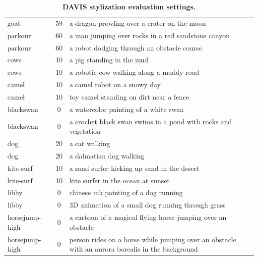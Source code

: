 \begin{table}[tp]
\begin{tabular}{lcp{10cm}}
goat & 59 & a dragon prowling over a crater on the moon \\
parkour & 60 & a man jumping over rocks in a red sandstone canyon \\
parkour & 60 & a robot dodging through an obstacle course \\
cows & 10 & a pig standing in the mud \\
cows & 10 & a robotic cow walking along a muddy road \\
camel & 10 & a camel robot on a snowy day  \\
camel & 10 & toy camel standing on dirt near a fence \\
blackswan & 0 & a watercolor painting of a white swan \\
blackswan & 0 & a crochet black swan swims in a pond with rocks and vegetation \\
dog & 20 & a cat walking \\
dog & 20 & a dalmatian dog walking \\
kite-surf & 10 & a sand surfer kicking up sand in the desert \\
kite-surf & 10 & kite surfer in the ocean at sunset \\
libby & 0 & chinese ink painting of a dog running \\
libby & 0 & 3D animation of a small dog running  through grass \\
horsejump-high & 0 & a cartoon of a magical flying horse jumping over an obstacle \\
horsejump-high & 0 & person rides on a horse while jumping over an obstacle with an aurora borealis in the background \\

\bottomrule
\end{tabular}
\caption{\textbf{DAVIS stylization evaluation settings.}}
\end{table}
